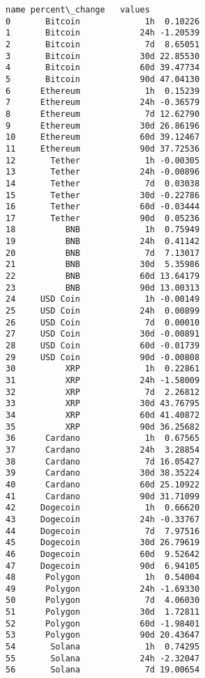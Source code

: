 \documentclass[11pt]{article}
\makeatletter
\newcommand{\boxspacing}{\kern\kvtcb@left@rule\kern\kvtcb@boxsep}
\newcommand{\prompt}[4]{
        {\ttfamily\llap{{\color{#2}[#3]:\hspace{3pt}#4}}\vspace{-\baselineskip}}
    }
\makeatother
\begin{document}
            \begin{tcolorbox}[breakable, size=fbox, boxrule=.5pt, pad at break*=1mm, opacityfill=0]
\prompt{Out}{outcolor}{57}{\boxspacing}
\begin{Verbatim}[commandchars=\\\{\}]
           name percent\_change   values
0       Bitcoin             1h  0.10226
1       Bitcoin            24h -1.20539
2       Bitcoin             7d  8.65051
3       Bitcoin            30d 22.85530
4       Bitcoin            60d 39.47734
5       Bitcoin            90d 47.04130
6      Ethereum             1h  0.15239
7      Ethereum            24h -0.36579
8      Ethereum             7d 12.62790
9      Ethereum            30d 26.86196
10     Ethereum            60d 39.12467
11     Ethereum            90d 37.72536
12       Tether             1h -0.00305
13       Tether            24h -0.00896
14       Tether             7d  0.03038
15       Tether            30d -0.22786
16       Tether            60d -0.03444
17       Tether            90d  0.05236
18          BNB             1h  0.75949
19          BNB            24h  0.41142
20          BNB             7d  7.13017
21          BNB            30d  5.35986
22          BNB            60d 13.64179
23          BNB            90d 13.00313
24     USD Coin             1h -0.00149
25     USD Coin            24h  0.00899
26     USD Coin             7d  0.00010
27     USD Coin            30d -0.00891
28     USD Coin            60d -0.01739
29     USD Coin            90d -0.00808
30          XRP             1h  0.22861
31          XRP            24h -1.58009
32          XRP             7d  2.26812
33          XRP            30d 43.76795
34          XRP            60d 41.40872
35          XRP            90d 36.25682
36      Cardano             1h  0.67565
37      Cardano            24h  3.28854
38      Cardano             7d 16.05427
39      Cardano            30d 38.35224
40      Cardano            60d 25.10922
41      Cardano            90d 31.71099
42     Dogecoin             1h  0.66620
43     Dogecoin            24h -0.33767
44     Dogecoin             7d  7.97516
45     Dogecoin            30d 26.79619
46     Dogecoin            60d  9.52642
47     Dogecoin            90d  6.94105
48      Polygon             1h  0.54004
49      Polygon            24h -1.69330
50      Polygon             7d  4.06030
51      Polygon            30d  1.72811
52      Polygon            60d -1.98401
53      Polygon            90d 20.43647
54       Solana             1h  0.74295
55       Solana            24h -2.32047
56       Solana             7d 19.00654

\end{Verbatim}
\end{tcolorbox}
\end{document}
